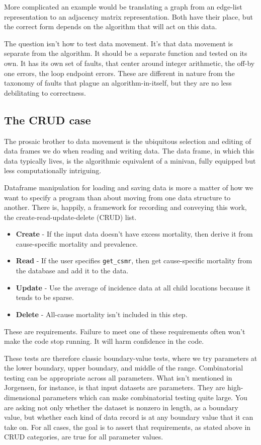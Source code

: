 \documentclass[fleqn,10pt]{olplainarticle}
\begin{document}
More complicated an example would be translating a graph from
an edge-list representation to an adjacency matrix representation.
Both have their place, but the correct form depends on the
algorithm that will act on this data.

The question isn't how to test data movement. It's that data
movement is separate from the algorithm. It should be a separate
function and tested on its own. It has its own set of faults,
that center around integer arithmetic, the off-by one errors,
the loop endpoint errors. These are different in nature from
the taxonomy of faults that plague an algorithm-in-itself,
but they are no less debilitating to correctness.

\subsection{The CRUD case}\label{sec:crud}

The prosaic brother to data movement is the ubiquitous selection
and editing of data frames we do when reading and writing data.
The data frame, in which this data typically lives, is the
algorithmic equivalent of a minivan, fully equipped but less
computationally intriguing.

Dataframe manipulation for loading and saving data is more a matter
of how we want to specify a program than about moving from
one data structure to another. There is, happily, a framework
for recording and conveying this work, the create-read-update-delete
(CRUD) list.

\begin{itemize}
\item \textbf{Create} - If the input data doesn't have excess mortality,
  then derive it from cause-specific mortality and prevalence.
\item \textbf{Read} - If the user specifies \lstinline!get_csmr!, then get cause-specific
  mortality from the database and add it to the data.
\item \textbf{Update} - Use the average of incidence data at all child
  locations because it tends to be sparse.
\item \textbf{Delete} - All-cause mortality isn't included in this step.
\end{itemize}

These are requirements. Failure to meet one of these requirements
often won't make the code stop running. It will harm confidence
in the code.

These tests are therefore classic boundary-value tests, where
we try parameters at the lower boundary, upper boundary,
and middle of the range. Combinatorial testing can be appropriate
across all parameters. What isn't mentioned in Jorgensen, for instance,
is that input datasets are parameters. They are high-dimensional
parameters which can make combinatorial testing quite large.
You are asking not only whether the dataset is nonzero in length,
as a boundary value, but whether each kind of data record is at
any boundary value that it can take on. For all cases, the goal
is to assert that requirements, as stated above in CRUD categories,
are true for all parameter values.
\end{document}
